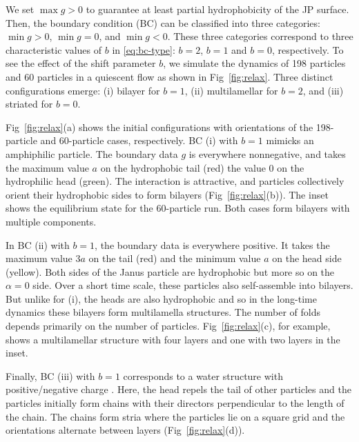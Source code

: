 \documentclass[prb,preprint,showpacs,preprintnumbers,amsmath,amssymb,longbibliography]{revtex4-1}
\begin{document}
We set $\max g>0$ to guarantee at least partial hydrophobicity of the JP surface.
Then, the boundary condition (BC) can be classified into
three categories: $\min g >0$, $\min g =0$, and $\min g <0$.  
These three categories correspond to three characteristic
values of $b$ in \eqref{eq:bc-type}: $b=2$, $b=1$ and $b=0$, respectively. 
%
To see the effect of the shift parameter $b$, we simulate the dynamics of
198 particles and 60 particles in a quiescent flow as shown in Fig~\ref{fig:relax}.
Three distinct configurations emerge:
(i) bilayer for $b = 1$, 
(ii) multilamellar for $b = 2$, and 
(iii) striated for $b = 0$.

Fig~\ref{fig:relax}(a) shows the initial configurations with
orientations of the 198-particle and 60-particle cases,
respectively. 
BC (i) with $b = 1$ mimicks an amphiphilic particle.
The boundary data $g$ is everywhere nonnegative,
and takes
the maximum value $a$ on the hydrophobic tail (red)
the value $0$ on the hydrophilic head (green). 
The interaction is attractive, and particles collectively orient their
hydrophobic sides to form bilayers  (Fig~\ref{fig:relax}(b)). The inset shows the equilibrium 
state for the 60-particle run.
Both cases form bilayers with multiple components. 

In BC (ii) with $b = 1$, the boundary data is everywhere positive.
It takes the maximum value $3a$ on the tail (red) and the
minimum value $a$ on the head side (yellow). 
Both sides of the Janus particle are hydrophobic but
more so on the $\alpha = 0$ side.  
Over a short time scale, these particles also self-assemble into bilayers. But unlike for  (i),
the heads are also hydrophobic and so in the long-time dynamics
these bilayers form multilamella structures.
The number of folds depends primarily on the number of particles.
Fig~\ref{fig:relax}(c), for example, shows a
multilamellar structure with four layers and one with two layers in the inset.

Finally, BC (iii) with $b=1$ 
corresponds to a water structure with
positive/negative charge \cite{MaRa76, Ma77}.
Here, the head repels the tail of other particles
and the particles initially form chains with their directors perpendicular
to the length of the chain.  
The chains form stria
where the particles lie on a 
square grid and the orientations alternate
between layers (Fig~\ref{fig:relax}(d)).
\end{document}
